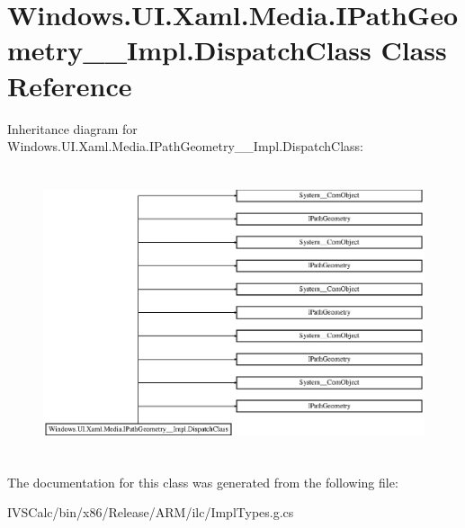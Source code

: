 \hypertarget{class_windows_1_1_u_i_1_1_xaml_1_1_media_1_1_i_path_geometry_____impl_1_1_dispatch_class}{}\section{Windows.\+U\+I.\+Xaml.\+Media.\+I\+Path\+Geometry\+\_\+\+\_\+\+Impl.\+Dispatch\+Class Class Reference}
\label{class_windows_1_1_u_i_1_1_xaml_1_1_media_1_1_i_path_geometry_____impl_1_1_dispatch_class}
Inheritance diagram for Windows.\+U\+I.\+Xaml.\+Media.\+I\+Path\+Geometry\+\_\+\+\_\+\+Impl.\+Dispatch\+Class\+:\begin{figure}[H]
\begin{center}
\leavevmode
\includegraphics[height=8.508287cm]{class_windows_1_1_u_i_1_1_xaml_1_1_media_1_1_i_path_geometry_____impl_1_1_dispatch_class}
\end{center}
\end{figure}


The documentation for this class was generated from the following file\+:\begin{DoxyCompactItemize}
\item 
I\+V\+S\+Calc/bin/x86/\+Release/\+A\+R\+M/ilc/Impl\+Types.\+g.\+cs\end{DoxyCompactItemize}
